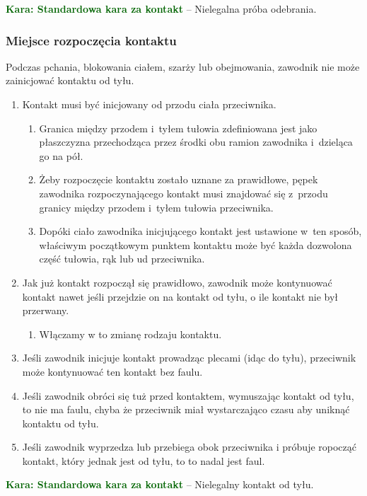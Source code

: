 \documentclass[11pt,a4paper]{article}
\newcommand\penaltyd[2]{\bgroup\textcolor{darkgreen}{\textbf{Kara: #1}} -- #2}
\begin{document}
\penaltyd{Standardowa kara za kontakt}{Nielegalna próba odebrania.}

\subsubsection{Miejsce rozpoczęcia kontaktu}
Podczas pchania, blokowania ciałem, szarży lub obejmowania, zawodnik nie może zainicjować kontaktu od tyłu.
\begin{enumerate}
  \item Kontakt musi być inicjowany od przodu ciała przeciwnika.
  \begin{enumerate}
    \item Granica między przodem i~tyłem tułowia zdefiniowana jest jako
    płaszczyzna przechodząca przez środki obu ramion zawodnika i~dzieląca go na pół.
    \item Żeby rozpoczęcie kontaktu zostało uznane za prawidłowe, pępek
    zawodnika rozpoczynającego kontakt musi znajdować się z~przodu granicy między przodem i~tyłem tułowia przeciwnika.
    \item Dopóki ciało zawodnika inicjującego kontakt jest ustawione w~ten
    sposób, właściwym początkowym punktem kontaktu może być każda dozwolona część tułowia, rąk lub ud przeciwnika.
  \end{enumerate}
  \item Jak już kontakt rozpoczął się prawidłowo, zawodnik może kontynuować kontakt nawet jeśli przejdzie on na kontakt od tyłu, o ile kontakt nie był przerwany.
  \begin{enumerate}
    \item Włączamy w to zmianę rodzaju kontaktu.
  \end{enumerate}
  \item Jeśli zawodnik inicjuje kontakt prowadząc plecami (idąc do tyłu), przeciwnik może kontynuować ten kontakt bez faulu.
  \item Jeśli zawodnik obróci się tuż przed kontaktem, wymuszając kontakt od tyłu, to nie ma faulu, chyba że przeciwnik miał wystarczająco czasu aby uniknąć kontaktu od tyłu.
  \item Jeśli zawodnik wyprzedza lub przebiega obok przeciwnika i próbuje ropocząć kontakt, który jednak jest od tyłu, to to nadal jest faul.
\end{enumerate}

\penaltyd{Standardowa kara za kontakt}{Nielegalny kontakt od tyłu.}
\end{document}
